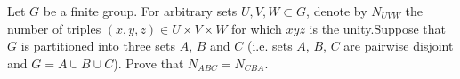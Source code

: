 \documentclass{article}
\begin{document}
\setlength{\parindent}{0pt}
Let $G$ be a finite group. For arbitrary sets $U,V,W\subset G$, denote by $N_{UVW}$ the number of triples $(x,y,z)\in U\times V\times W$ for which $xyz$ is the unity.\newline Suppose that $G$ is partitioned into three sets $A$, $B$ and $C$ (i.e. sets $A$, $B$, $C$ are pairwise disjoint and $G=A\cup B\cup C$). Prove that $N_{ABC}=N_{CBA}$.
\end{document}
